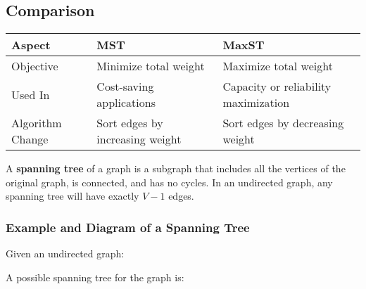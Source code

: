 \subsection{Comparison}
\begin{center}
\begin{tabular}{|l|l|l|}
\hline
\textbf{Aspect} & \textbf{MST} & \textbf{MaxST} \\
\hline
Objective & Minimize total weight & Maximize total weight \\
\hline
Used In & Cost-saving applications & Capacity or reliability maximization \\
\hline
Algorithm Change & Sort edges by increasing weight & Sort edges by decreasing weight \\
\hline
\end{tabular}
\end{center}
A \textbf{spanning tree} of a graph is a subgraph that includes all the vertices of the original graph, is connected, and has no cycles. In an undirected graph, any spanning tree will have exactly \( V - 1 \) edges.

\subsubsection{Example and Diagram of a Spanning Tree}
Given an undirected graph:
\begin{center}
\end{center}

A possible spanning tree for the graph is:
\begin{center}
\end{center}

